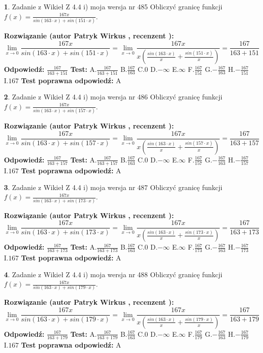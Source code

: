 \documentclass[12pt, a4paper]{article}
\theoremstyle{definition} %
\newtheorem{zad}{}
\newcommand{\zadStart}[1]{\begin{zad}#1\newline}
\newcommand{\zadStop}{\end{zad}}
\newcommand{\rozwStart}[2]{\noindent \textbf{Rozwiązanie (autor #1 , recenzent #2): }\newline}
\newcommand{\rozwStop}{\newline}
\newcommand{\odpStart}{\noindent \textbf{Odpowiedź:}\newline}
\newcommand{\odpStop}{\newline}
\newcommand{\testStart}{\noindent \textbf{Test:}\newline}
\newcommand{\testStop}{\newline}
\newcommand{\kluczStart}{\noindent \textbf{Test poprawna odpowiedź:}\newline}
\newcommand{\kluczStop}{\newline}
\begin{document}
\zadStart{Zadanie z Wikieł Z 4.4 i) moja wersja nr 485}
Obliczyć granicę funkcji $f(x)=\frac{167x}{sin(163\cdot x) +sin(151\cdot x)}$.
\zadStop
\rozwStart{Patryk Wirkus}{}
$$\lim\limits_{x\to 0}\frac{167x}{sin(163\cdot x) +sin(151\cdot x)}=\lim\limits_{x\to 0}\frac{167x}{x(\frac{sin(163\cdot x)}{x}+\frac{sin(151\cdot x)}{x})}=\frac{167}{163+151}$$
\rozwStop
\odpStart
$\frac{167}{163+151}$
\odpStop
\testStart
A.$\frac{167}{163+151}$
B.$\frac{167}{163}$
C.$0$
D.$-\infty$
E.$\infty$
F.$\frac{167}{151}$
G.$-\frac{167}{163}$
H.$-\frac{167}{151}$
I.$167$
\testStop
\kluczStart
A
\kluczStop



\zadStart{Zadanie z Wikieł Z 4.4 i) moja wersja nr 486}
Obliczyć granicę funkcji $f(x)=\frac{167x}{sin(163\cdot x) +sin(157\cdot x)}$.
\zadStop
\rozwStart{Patryk Wirkus}{}
$$\lim\limits_{x\to 0}\frac{167x}{sin(163\cdot x) +sin(157\cdot x)}=\lim\limits_{x\to 0}\frac{167x}{x(\frac{sin(163\cdot x)}{x}+\frac{sin(157\cdot x)}{x})}=\frac{167}{163+157}$$
\rozwStop
\odpStart
$\frac{167}{163+157}$
\odpStop
\testStart
A.$\frac{167}{163+157}$
B.$\frac{167}{163}$
C.$0$
D.$-\infty$
E.$\infty$
F.$\frac{167}{157}$
G.$-\frac{167}{163}$
H.$-\frac{167}{157}$
I.$167$
\testStop
\kluczStart
A
\kluczStop



\zadStart{Zadanie z Wikieł Z 4.4 i) moja wersja nr 487}
Obliczyć granicę funkcji $f(x)=\frac{167x}{sin(163\cdot x) +sin(173\cdot x)}$.
\zadStop
\rozwStart{Patryk Wirkus}{}
$$\lim\limits_{x\to 0}\frac{167x}{sin(163\cdot x) +sin(173\cdot x)}=\lim\limits_{x\to 0}\frac{167x}{x(\frac{sin(163\cdot x)}{x}+\frac{sin(173\cdot x)}{x})}=\frac{167}{163+173}$$
\rozwStop
\odpStart
$\frac{167}{163+173}$
\odpStop
\testStart
A.$\frac{167}{163+173}$
B.$\frac{167}{163}$
C.$0$
D.$-\infty$
E.$\infty$
F.$\frac{167}{173}$
G.$-\frac{167}{163}$
H.$-\frac{167}{173}$
I.$167$
\testStop
\kluczStart
A
\kluczStop



\zadStart{Zadanie z Wikieł Z 4.4 i) moja wersja nr 488}
Obliczyć granicę funkcji $f(x)=\frac{167x}{sin(163\cdot x) +sin(179\cdot x)}$.
\zadStop
\rozwStart{Patryk Wirkus}{}
$$\lim\limits_{x\to 0}\frac{167x}{sin(163\cdot x) +sin(179\cdot x)}=\lim\limits_{x\to 0}\frac{167x}{x(\frac{sin(163\cdot x)}{x}+\frac{sin(179\cdot x)}{x})}=\frac{167}{163+179}$$
\rozwStop
\odpStart
$\frac{167}{163+179}$
\odpStop
\testStart
A.$\frac{167}{163+179}$
B.$\frac{167}{163}$
C.$0$
D.$-\infty$
E.$\infty$
F.$\frac{167}{179}$
G.$-\frac{167}{163}$
H.$-\frac{167}{179}$
I.$167$
\testStop
\kluczStart
A
\kluczStop
\end{document}
